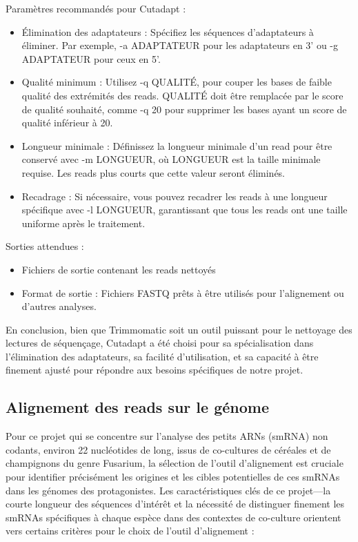 \documentclass{report}
\begin{document}
\noindent Paramètres recommandés pour Cutadapt :
\begin{itemize}
    \item Élimination des adaptateurs : Spécifiez les séquences d'adaptateurs à éliminer. Par exemple, -a ADAPTATEUR pour les adaptateurs en 3' ou -g ADAPTATEUR pour ceux en 5'.
    \item Qualité minimum : Utilisez -q QUALITÉ, pour couper les bases de faible qualité des extrémités des reads. QUALITÉ doit être remplacée par le score de qualité souhaité, comme -q 20 pour supprimer les bases ayant un score de qualité inférieur à 20.
    \item Longueur minimale : Définissez la longueur minimale d'un read pour être conservé avec -m LONGUEUR, où LONGUEUR est la taille minimale requise. Les reads plus courts que cette valeur seront éliminés.
    \item Recadrage : Si nécessaire, vous pouvez recadrer les reads à une longueur spécifique avec -l LONGUEUR, garantissant que tous les reads ont une taille uniforme après le traitement.
\end{itemize} \vspace{.5cm}

\noindent Sorties attendues :
 \begin{itemize}
     \item Fichiers de sortie contenant les reads nettoyés
     \item Format de sortie : Fichiers FASTQ prêts à être utilisés pour l'alignement ou d'autres analyses.
 \end{itemize} \vspace{.5cm}
 
En conclusion, bien que Trimmomatic soit un outil puissant pour le nettoyage des lectures de séquençage, Cutadapt a été choisi pour sa spécialisation dans l'élimination des adaptateurs, sa facilité d'utilisation, et sa capacité à être finement ajusté pour répondre aux besoins spécifiques de notre projet.
 
\subsection{Alignement des reads sur le génome}
Pour ce projet qui se concentre sur l'analyse des petits ARNs (smRNA) non codants, environ 22 nucléotides de long, issus de co-cultures de céréales et de champignons du genre Fusarium, la sélection de l'outil d'alignement est cruciale pour identifier précisément les origines et les cibles potentielles de ces smRNAs dans les génomes des protagonistes. Les caractéristiques clés de ce projet—la courte longueur des séquences d'intérêt et la nécessité de distinguer finement les smRNAs spécifiques à chaque espèce dans des contextes de co-culture orientent vers certains critères pour le choix de l'outil d'alignement :
\end{document}
